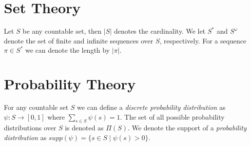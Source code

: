 \section*{Set Theory}
Let $S$ be any countable set, then $|S|$ denotes the cardinality. We let $S^*$ and $S^\omega$ denote the set of finite and infinite sequences over $S$, respectively. For a sequence $\pi\in S^*$ we can denote the length by $|\pi|$.



\section*{Probability Theory}
For any countable set $S$ we can define a \textit{discrete probability distribution} as $\psi: S\to[0,1]$ where $\sum_{s\in S} \psi(s)=1$. The set of all possible probability distributions over $S$ is denoted as $\Pi(S)$. We denote the support of a \textit{probability distribution} as $supp(\psi)=\{s\in S\mid \psi(s)>0\}$.\\





